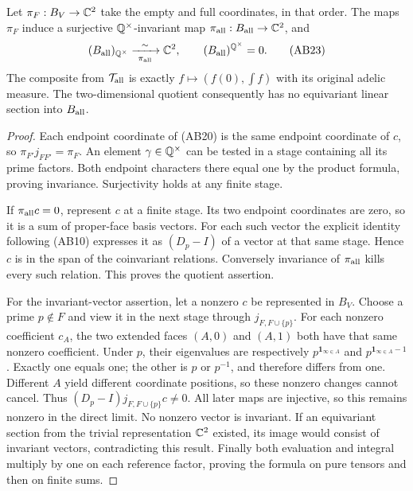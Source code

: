 \begin{theorem}
\label{thm:global-boundary}
Let $\pi_F:B_V\to\mathbb C^2$ take the empty and full coordinates, in that order.
The maps $\pi_F$ induce a surjective $\mathbb Q^\times$-invariant map
$\pi_{\rm all}:B_{\rm all}\to\mathbb C^2$, and
\[
 (B_{\rm all})_{\mathbb Q^\times}\xrightarrow[\ \pi_{\rm all}\ ]{\sim}\mathbb C^2,
 \qquad (B_{\rm all})^{\mathbb Q^\times}=0.
 \tag{AB23}
\]
The composite from $\mathcal T_{\rm all}$ is exactly
$f\mapsto(f(0),\int f)$ with its original adelic measure.
The two-dimensional quotient consequently has no equivariant linear
section into $B_{\rm all}$.
\end{theorem}
\begin{proof}
Each endpoint coordinate of (AB20) is the same endpoint coordinate of
$c$, so $\pi_{F'}j_{FF'}=\pi_F$. An element $\gamma\in\mathbb Q^\times$
can be tested in a stage containing all its prime factors. Both endpoint
characters there equal one by the product formula, proving invariance.
Surjectivity holds at any finite stage.

If $\pi_{\rm all}c=0$, represent $c$ at a finite stage. Its two endpoint
coordinates are zero, so it is a sum of proper-face basis vectors. For
each such vector the explicit identity following (AB10) expresses it as
$(D_p-I)$ of a vector at that same stage. Hence $c$ is in the span of
the coinvariant relations. Conversely invariance of $\pi_{\rm all}$
kills every such relation. This proves the quotient assertion.

For the invariant-vector assertion, let a nonzero $c$ be represented in
$B_V$. Choose a prime $p\notin F$ and view it in the next stage through
$j_{F,F\cup\{p\}}$. For each nonzero coefficient $c_A$, the two
extended faces $(A,0)$ and $(A,1)$ both have that same nonzero coefficient.
Under $p$, their eigenvalues are respectively
$p^{\mathbf1_{\infty\in A}}$ and
$p^{\mathbf1_{\infty\in A}-1}$. Exactly one equals one; the other is
$p$ or $p^{-1}$, and therefore differs from one. Different $A$ yield
different coordinate positions, so these nonzero changes cannot cancel.
Thus $(D_p-I)j_{F,F\cup\{p\}}c\ne0$. All later maps are injective, so
this remains nonzero in the direct limit. No nonzero vector is invariant.
If an equivariant section from the trivial representation $\mathbb C^2$ existed,
its image would consist of invariant vectors, contradicting this result.
Finally both evaluation and integral multiply by one on each reference
factor, proving the formula on pure tensors and then on finite sums.
\end{proof}

